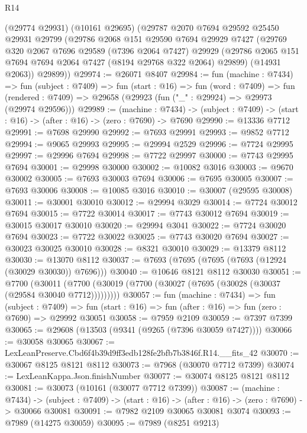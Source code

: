\begin{lexlean}{R14}
\begin{coremodule}
    (@29774 @29931)
    (@10161 @29695)
    (@29787
      @2070
      @7694
      @29592
      @25450
      @29931
      @29799
      (@29786
        @2068
        @151
        @29590
        @7694
        @29929
        @7427
        (@29769
          @320
          @2067
          @7696
          @29589
          (@7396 @2064 @7427)
          @29929
          (@29786 @2065 @151 @7694 @7694 @2064 @7427 (@8194 @29768 @322 @2064) @29899)
          (@14931 @2063))
        @29899))
@29974 := @26071 @8407
@29984 := fun (machine : @7434) =>
  fun (subject : @7409) =>
  fun (start : @16) =>
  fun (word : @7409) =>
  fun (rendered : @7409) => @29658 (@29923 (fun ("_" : @29924) => @29973 (@29974 @29596)))
@29989 := (machine : @7434) ->
  (subject : @7409) -> (start : @16) -> (after : @16) -> (zero : @7690) -> @7690
@29990 := @13336 @7712
@29991 := @7698 @29990
@29992 := @7693 @29991
@29993 := @9852 @7712
@29994 := @9065 @29993
@29995 := @29994 @2529
@29996 := @7724 @29995
@29997 := @29996 @7694
@29998 := @7722 @29997
@30000 := @7743 @29995 @7694
@30001 := @29998 @30000
@30002 := @10082 @3016
@30003 := @9670 @30002
@30005 := @7693 @30003 @7694
@30006 := @7695 @30005
@30007 := @7693 @30006
@30008 := @10085 @3016
@30010 := @30007 (@29595 @30008)
@30011 := @30001 @30010
@30012 := @29994 @3029
@30014 := @7724 @30012 @7694
@30015 := @7722 @30014
@30017 := @7743 @30012 @7694
@30019 := @30015 @30017 @30010
@30020 := @29994 @3041
@30022 := @7724 @30020 @7694
@30023 := @7722 @30022
@30025 := @7743 @30020 @7694
@30027 := @30023 @30025 @30010
@30028 := @8321 @30010
@30029 := @13379 @8112
@30030 := @13070 @8112
@30037 := @7693 (@7695 (@7695 (@7693 (@12924 (@30029 @30030)) @7696)))
@30040 := @10646 @8121 @8112 @30030
@30051 := @7700
    (@30011 (@7700 (@30019 (@7700 (@30027 (@7695 (@30028 (@30037 (@29584 @30040 @7712)))))))))
@30057 := fun (machine : @7434) =>
  fun (subject : @7409) =>
  fun (start : @16) => fun (after : @16) => fun (zero : @7690) => @29992 @30051
@30058 := @7959 @2109
@30059 := @7397 @7399
@30065 := @29608 (@13503 (@9341 (@9265 (@7396 @30059 @7427))))
@30066 := @30058 @30065
@30067 := LexLeanPreserve.Cbd6f4b39d9ff3edb128fe2bfb7b3846f.R14.__fits_42
@30070 := @30067 @8125 @8121 @8112
@30073 := @7968 (@30070 @7712 @7399)
@30074 := LexLeanKappa.Json.finishNumber
@30077 := @30074 @8125 @8121 @8112
@30081 := @30073 (@10161 (@30077 @7712 @7399))
@30087 := (machine : @7434) ->
  (subject : @7409) -> (start : @16) -> (after : @16) -> (zero : @7690) -> @30066 @30081
@30091 := @7982 @2109 @30065 @30081 @3074
@30093 := @7989 (@14275 @30059)
@30095 := @7989 (@8251 @9213)

\end{coremodule}
\end{lexlean}
